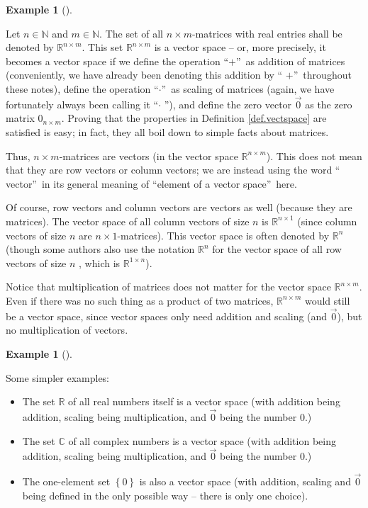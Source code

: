 \documentclass[numbers=enddot,12pt,final,onecolumn,notitlepage]{scrartcl}%
\theoremstyle{definition}
\newtheorem{exam}[theo]{Example}
\newenvironment{example}[1][]
{\begin{exam}[#1]\begin{leftbar}}
{\end{leftbar}\end{exam}}
\begin{document}
\begin{example}
\label{exam.vectspace.Rnm}Let $n\in\mathbb{N}$ and $m\in\mathbb{N}$. The set
of all $n\times m$-matrices with real entries shall be denoted by
$\mathbb{R}^{n\times m}$. This set $\mathbb{R}^{n\times m}$ is a vector space
-- or, more precisely, it becomes a vector space if we define the operation
\textquotedblleft$+$\textquotedblright\ as addition of matrices (conveniently,
we have already been denoting this addition by \textquotedblleft%
$+$\textquotedblright\ throughout these notes), define the operation
\textquotedblleft$\cdot$\textquotedblright\ as scaling of matrices (again, we
have fortunately always been calling it \textquotedblleft$\cdot$%
\textquotedblright), and define the zero vector $\overrightarrow{0}$ as the
zero matrix $0_{n\times m}$. Proving that the properties in Definition
\ref{def.vectspace} are satisfied is easy; in fact, they all boil down to
simple facts about matrices.

Thus, $n\times m$-matrices are vectors (in the vector space $\mathbb{R}%
^{n\times m}$). This does not mean that they are row vectors or column
vectors; we are instead using the word \textquotedblleft
vector\textquotedblright\ in its general meaning of \textquotedblleft element
of a vector space\textquotedblright\ here.

Of course, row vectors and column vectors are vectors as well (because they
are matrices). The vector space of all column vectors of size $n$ is
$\mathbb{R}^{n\times1}$ (since column vectors of size $n$ are $n\times
1$-matrices). This vector space is often denoted by $\mathbb{R}^{n}$ (though
some authors also use the notation $\mathbb{R}^{n}$ for the vector space of
all row vectors of size $n$ , which is $\mathbb{R}^{1\times n}$).

Notice that multiplication of matrices does not matter for the vector space
$\mathbb{R}^{n\times m}$. Even if there was no such thing as a product of two
matrices, $\mathbb{R}^{n\times m}$ would still be a vector space, since vector
spaces only need addition and scaling (and $\overrightarrow{0}$), but no
multiplication of vectors.
\end{example}

\begin{example}
\label{exam.vectspace.RC0}Some simpler examples:

\begin{itemize}
\item The set $\mathbb{R}$ of all real numbers itself is a vector space (with
addition being addition, scaling being multiplication, and $\overrightarrow{0}%
$ being the number $0$.)

\item The set $\mathbb{C}$ of all complex numbers is a vector space (with
addition being addition, scaling being multiplication, and $\overrightarrow{0}%
$ being the number $0$.)

\item The one-element set $\left\{  0\right\}  $ is also a vector space (with
addition, scaling and $\overrightarrow{0}$ being defined in the only possible
way -- there is only one choice).
\end{itemize}
\end{example}
\end{document}
